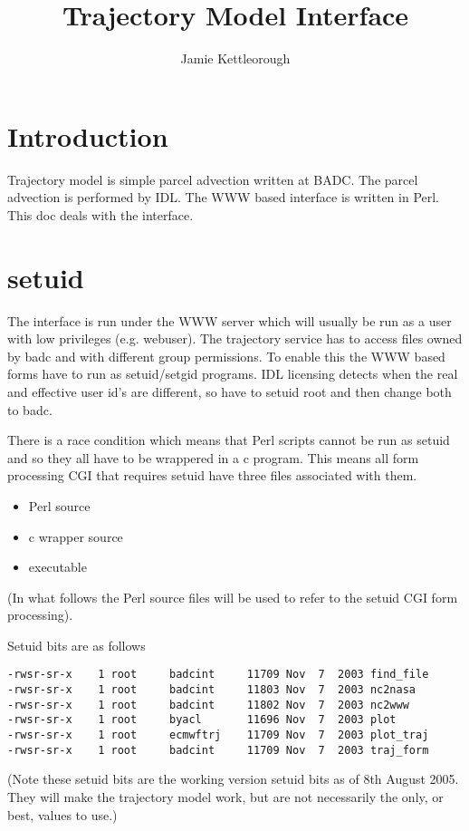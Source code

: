 \documentclass[a4paper]{article}
\title{Trajectory Model Interface}
\author{Jamie Kettleorough}
\begin{document}
\maketitle

\section{Introduction}

Trajectory model is simple parcel advection written at BADC.  The
parcel advection is performed by IDL.  The WWW based interface is
written in Perl.  This doc deals with the interface.

\section{setuid}

The interface is run under the WWW server which will usually be run as
a user with low privileges (e.g. webuser).  The trajectory service has
to access files owned by badc and with different group permissions.
To enable this the WWW based forms have to run as setuid/setgid
programs.  IDL licensing detects when the real and effective user id's
are different, so have to setuid root and then change both to badc.

There is a race condition which means that Perl scripts cannot be run
as setuid and so they all have to be wrappered in a c program.  This
means all form processing CGI that requires setuid have three files
associated with them.

\begin{itemize}
\item Perl source
\item c wrapper source
\item executable
\end{itemize}
(In what follows the Perl source files will be used to refer to the
setuid CGI form processing).

Setuid bits are as follows
\begin{verbatim}
-rwsr-sr-x    1 root     badcint     11709 Nov  7  2003 find_file
-rwsr-sr-x    1 root     badcint     11803 Nov  7  2003 nc2nasa
-rwsr-sr-x    1 root     badcint     11802 Nov  7  2003 nc2www
-rwsr-sr-x    1 root     byacl       11696 Nov  7  2003 plot
-rwsr-sr-x    1 root     ecmwftrj    11709 Nov  7  2003 plot_traj
-rwsr-sr-x    1 root     badcint     11709 Nov  7  2003 traj_form
\end{verbatim}
(Note these setuid bits are the working version setuid bits as of 8th
August 2005.  They will make the trajectory model work, but are not
necessarily the only, or best, values to use.)
\end{document}
